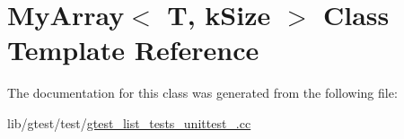 \hypertarget{class_my_array}{\section{My\-Array$<$ T, k\-Size $>$ Class Template Reference}
\label{class_my_array}
}


The documentation for this class was generated from the following file\-:\begin{DoxyCompactItemize}
\item 
lib/gtest/test/\hyperlink{gtest__list__tests__unittest___8cc}{gtest\-\_\-list\-\_\-tests\-\_\-unittest\-\_\-.\-cc}\end{DoxyCompactItemize}
